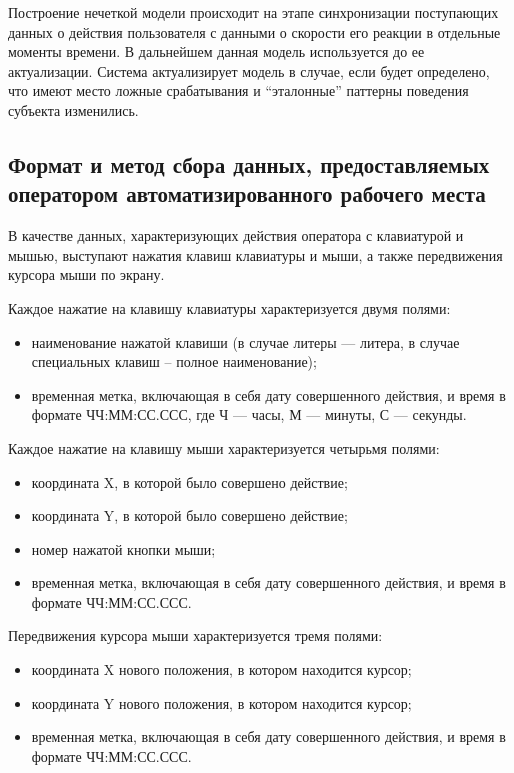Построение нечеткой модели происходит на этапе синхронизации поступающих данных о действия пользователя с данными о скорости его реакции в отдельные моменты времени. В дальнейшем данная модель используется до ее актуализации. Система актуализирует модель в случае, если будет определено, что имеют место ложные срабатывания и ``эталонные'' паттерны поведения субъекта изменились.

\subsection{Формат и метод сбора данных, предоставляемых оператором автоматизированного рабочего места}
В качестве данных, характеризующих действия оператора с клавиатурой и мышью, выступают нажатия клавиш клавиатуры и мыши, а также передвижения курсора мыши по экрану.

Каждое нажатие на клавишу клавиатуры характеризуется двумя полями:
\begin{itemize}[leftmargin=1.6\parindent]
\item наименование нажатой клавиши (в случае литеры --- литера, в случае специальных клавиш -- полное наименование);
\item временная метка, включающая в себя дату совершенного действия, и время в формате ЧЧ:ММ:СС.ССС, где Ч --- часы, М --- минуты, С --- секунды.
\end{itemize}

Каждое нажатие на клавишу мыши характеризуется четырьмя полями:
\begin{itemize}[leftmargin=1.6\parindent]
\item координата X, в которой было совершено действие;
\item координата Y, в которой было совершено действие;
\item номер нажатой кнопки мыши;
\item временная метка, включающая в себя дату совершенного действия, и время в формате ЧЧ:ММ:СС.ССС.
\end{itemize}

Передвижения курсора мыши характеризуется тремя полями:
\begin{itemize}[leftmargin=1.6\parindent]
\item координата X нового положения, в котором находится курсор;
\item координата Y нового положения, в котором находится курсор;
\item временная метка, включающая в себя дату совершенного действия, и время в формате ЧЧ:ММ:СС.ССС.
\end{itemize}

